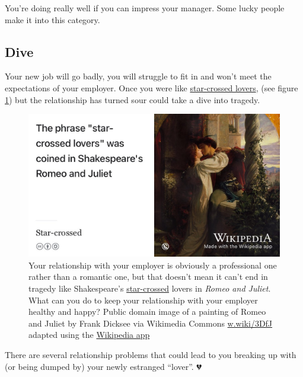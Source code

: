 \documentclass[
]{book}
\begin{document}
You're doing really well if you can impress your manager. Some lucky people make it into this category.

\hypertarget{dive}{%
\subsection{Dive}\label{dive}}

Your new job will go badly, you will struggle to fit in and won't meet the expectations of your employer. Once you were like \href{https://en.wikipedia.org/wiki/Star-crossed}{star-crossed lovers}, (see figure \ref{fig:romeo-fig}) but the relationship has turned sour could take a dive into tragedy. \citep{romeo, goblewroe}

\begin{figure}

{\centering \includegraphics[width=1\linewidth]{images/star-crossed-lovers} 

}

\caption{Your relationship with your employer is obviously a professional one rather than a romantic one, but that doesn't mean it can't end in tragedy like Shakespeare's \href{https://en.wikipedia.org/wiki/Star-crossed}{star-crossed} lovers in \emph{Romeo and Juliet}. \citep{romeo} What can you do to keep your relationship with your employer healthy and happy? Public domain image of a painting of Romeo and Juliet by Frank Dicksee via Wikimedia Commons \href{https://w.wiki/3DfJ}{w.wiki/3DfJ} adapted using the \href{https://apps.apple.com/gb/app/wikipedia/id324715238}{Wikipedia app}}\label{fig:romeo-fig}
\end{figure}



There are several relationship problems that could lead to you breaking up with (or being dumped by) your newly estranged ``lover''. 💔
\end{document}
